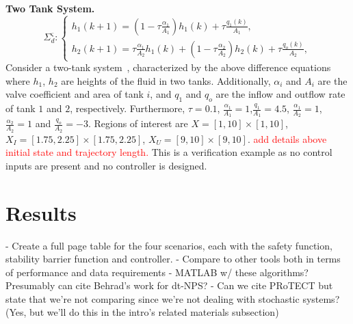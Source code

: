 \documentclass[sigconf]{acmart}
\newcommand{\BW}{\textcolor{red}}
\newcommand{\initial}{X_I}
\newcommand{\unsafe}{X_U}
\begin{document}
\noindent\textbf{Two Tank System.}
\begin{equation*}
\Sigma_d^\varsigma\!:\begin{cases}
h_1(k+1) = (1-\tau\frac{\alpha_1}{A_1})h_1(k) + \tau\frac{q_1(k)}{A_1},\\
h_2(k+1) = \tau\frac{\alpha_1}{A_2}h_1(k) + (1-\tau\frac{\alpha_2}{A_2})h_2(k) + \tau\frac{q_o(k)}{A_2},
\end{cases}
\end{equation*}
Consider a two-tank system~\cite{ramos2007mathematical}, characterized by the above difference equations where $h_1$, $h_2$ are heights of the fluid in two tanks. Additionally, $\alpha_i$ and $A_i$ are the valve coefficient and area of  tank $i$, and $q_1$ and $q_o$ are the inflow and outflow rate of tank $1$ and $2$, respectively. Furthermore, $\tau=0.1$, $\frac{\alpha_1}{A_1}=1$,$\frac{q_1}{A_1}=4.5$, $\frac{\alpha_1}{A_2}=1$, $\frac{\alpha_2}{A_2}=1$ and $\frac{q_o}{A_2}=-3$. Regions of interest are $X=[1,10]\times[1,10]$, $\initial=[1.75,2.25]\times[1.75,2.25]$, $\unsafe=[9,10]\times[9,10]$. \BW{add details above initial state and trajectory length.} This is a verification example as no control inputs are present and no controller is designed.

\section{Results}\label{sec:results}
- Create a full page table for the four scenarios, each with the safety function, stability barrier function and controller.
- Compare to other tools both in terms of performance and data requirements
- MATLAB w/ these algorithms?
Presumably can cite Behrad's work for dt-NPS?
- Can we cite PRoTECT but state that we're not comparing since we're not dealing with stochastic systems?
(Yes, but we'll do this in the intro's related materials subsection)



\end{document}
